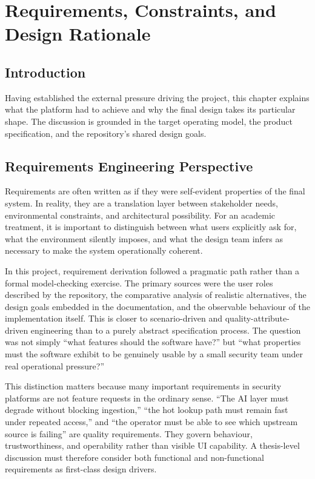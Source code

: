 \chapter{Requirements, Constraints, and Design Rationale}
\thispagestyle{plain}
\section*{Introduction}
Having established the external pressure driving the project, this chapter explains what the platform had to achieve and why the final design takes its particular shape. The discussion is grounded in the target operating model, the product specification, and the repository's shared design goals.

\section{Requirements Engineering Perspective}
Requirements are often written as if they were self-evident properties of the final system. In reality, they are a translation layer between stakeholder needs, environmental constraints, and architectural possibility. For an academic treatment, it is important to distinguish between what users explicitly ask for, what the environment silently imposes, and what the design team infers as necessary to make the system operationally coherent.

In this project, requirement derivation followed a pragmatic path rather than a formal model-checking exercise. The primary sources were the user roles described by the repository, the comparative analysis of realistic alternatives, the design goals embedded in the documentation, and the observable behaviour of the implementation itself. This is closer to scenario-driven and quality-attribute-driven engineering than to a purely abstract specification process. The question was not simply ``what features should the software have?'' but ``what properties must the software exhibit to be genuinely usable by a small security team under real operational pressure?''

This distinction matters because many important requirements in security platforms are not feature requests in the ordinary sense. ``The AI layer must degrade without blocking ingestion,'' ``the hot lookup path must remain fast under repeated access,'' and ``the operator must be able to see which upstream source is failing'' are quality requirements. They govern behaviour, trustworthiness, and operability rather than visible UI capability. A thesis-level discussion must therefore consider both functional and non-functional requirements as first-class design drivers.

